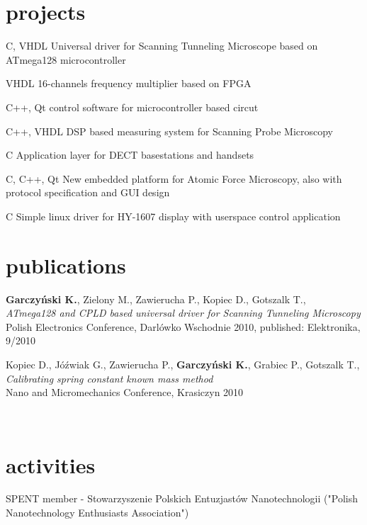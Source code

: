 \documentclass[]{friggeri-cv}
\begin{document}
\section{projects}

\begin{entrylist}
  \entry
    {C, VHDL}
    {Universal driver for Scanning Tunneling Microscope based on ATmega128 microcontroller}
    { }
    { }

  \entry
    {VHDL}
    {16-channels frequency multiplier based on FPGA}
    {}
    { }

  \entry
    {C++, Qt}
    {control software for microcontroller based circut}
    { }
    { }

  \entry
    {C++, VHDL}
    {DSP based measuring system for Scanning Probe Microscopy}
    { }
    { }
    
  \entry
    {C}
    {Application layer for DECT basestations and handsets}
    { }
    { }
    
  \entry
    {C, C++, Qt}
    {New embedded platform for Atomic Force Microscopy, also with protocol specification and GUI design}
    { }
    { }
    
  \entry
    {C}
    {Simple linux driver for HY-1607 display with userspace control application}
    { }
    { }

\end{entrylist}
 
\section{publications}
  \entry
    {\textbf{Garczyński K.}, Zielony M., Zawierucha P., Kopiec D., Gotszalk T., \\}
    {\textit{ATmega128 and CPLD based universal driver for Scanning Tunneling Microscopy} \\ }
    {Polish Electronics Conference, Darlówko Wschodnie 2010, published: Elektronika, 9/2010}


  \entry
    {Kopiec D., Jóźwiak G., Zawierucha P., \textbf{Garczyński K.}, Grabiec P., Gotszalk T., \\}
	{\textit{Calibrating spring constant known mass method} \\ }
    {Nano and Micromechanics Conference, Krasiczyn 2010}
    
    \\
\section{activities}
	SPENT member - Stowarzyszenie Polskich Entuzjastów Nanotechnologii ("Polish Nanotechnology Enthusiasts Association")
\end{document}
